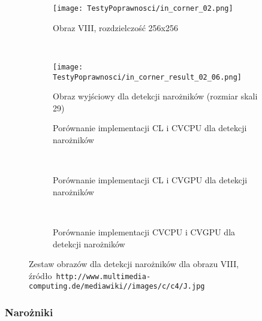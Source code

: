\begin{figure}[h]

\begin{center}
\begin{subfigure}[t]{0.3\textwidth}
\texttt{[image: TestyPoprawnosci/in\_corner\_02.png]}
\caption{Obraz VIII, rozdzielczość 256x256}
\label{fig:valCorner02}
\end{subfigure}
~
\begin{subfigure}[t]{0.3\textwidth}
\texttt{[image: TestyPoprawnosci/in\_corner\_result\_02\_06.png]}
\caption{Obraz wyjściowy dla detekcji narożników (rozmiar skali 29)}
\label{fig:valCornerResult02}
\end{subfigure}
\end{center}

\begin{subfigure}[t]{0.3\textwidth}
	\centering
	\setlength\fboxsep{0pt}
	\setlength\fboxrule{0.5pt}
	\caption{Porównanie implementacji CL i CVCPU dla detekcji narożników}
	\label{fig:valCorner2CLCVCPU}
\end{subfigure}
~
\begin{subfigure}[t]{0.3\textwidth}
	\centering
	\setlength\fboxsep{0pt}
	\setlength\fboxrule{0.5pt}
	\caption{Porównanie implementacji CL i CVGPU dla detekcji narożników}
	\label{fig:valCorner2CLCVGPU}
\end{subfigure}
~
\begin{subfigure}[t]{0.3\textwidth}
	\centering
	\setlength\fboxsep{0pt}
	\setlength\fboxrule{0.5pt}
	\caption{Porównanie implementacji CVCPU i CVGPU dla detekcji narożników}
	\label{fig:valCorner2CVCPUCVGPU}                 
\end{subfigure}
\caption{Zestaw obrazów dla detekcji narożników dla obrazu VIII, \tiny{źródło~\texttt{http://www.multimedia-computing.de/mediawiki//images/c/c4/J.jpg}}}

\label{fig:valCorner2}
\end{figure}

\subsubsection{Narożniki}
\label{subsubsec:naroznikiRysunki}

